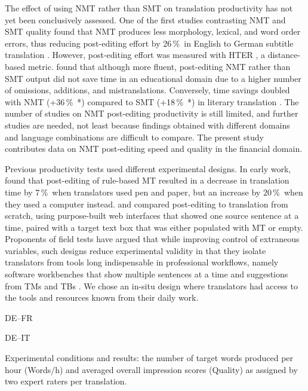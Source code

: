 \documentclass[11pt]{article}
\newcommand{\percent}{\,\%\ }
\begin{document}
The effect of using NMT rather than SMT on translation productivity has not yet been conclusively assessed. One of the first studies contrasting NMT and SMT quality found that NMT produces less morphology, lexical, and word order errors, thus reducing post-editing effort by 26\percent in English to German subtitle translation \citep{Bentivogli2016}. However, post-editing effort was measured with HTER \citep{Snover2006}, a distance-based metric. \citet{Castilho2017} found that although more fluent, post-editing NMT rather than SMT output did not save time in an educational domain due to a higher number of omissions, additions, and mistranslations. Conversely, time savings doubled with NMT (+36\percent*) compared to SMT (+18\percent*) in literary translation \citep{Toral2018Literary}. The number of studies on NMT post-editing productivity is still limited, and further studies are needed, not least because findings obtained with different domains and language combinations are difficult to compare. The present study contributes data on NMT post-editing speed and quality in the financial domain.

Previous productivity tests used different experimental designs. In early work, \citet{Krings1994} found that post-editing of rule-based MT resulted in a decrease in translation time by 7\percent when translators used pen and paper, but an increase by 20\percent when they used a computer instead. \citet{PlittMasselot2010} and \citet{Green2013} compared post-editing to translation from scratch, using purpose-built web interfaces that showed one source sentence at a time, paired with a target text box that was either populated with MT or empty. Proponents of field tests have argued that while improving control of extraneous variables, such designs reduce experimental validity in that they isolate translators from tools long indispensable in professional workflows, namely software workbenches that show multiple sentences at a time and suggestions from TMs and TBs \citep{Federico2012,Laeubli2013}. We chose an in-situ design where translators had access to the tools and resources known from their daily work.

\begin{table*}[t]
    \centering
    \begin{subtable}[b]{0.48\textwidth}
        \centering
        \renewcommand{\arraystretch}{1.2}
    \fontsize{10.1pt}{10.1pt}\selectfont
        
        \caption{DE--FR}
        \label{tab:ResultsFR}
    \end{subtable}
    \quad
    \begin{subtable}[b]{0.48\textwidth}
        \centering
        \renewcommand{\arraystretch}{1.2}
        \fontsize{10.1pt}{10.1pt}\selectfont
        
        \caption{DE--IT}
        \label{tab:ResultsIT}
    \end{subtable}
    \caption{Experimental conditions and results: the number of target words produced per hour (Words/h) and averaged overall impression scores (Quality) as assigned by two expert raters per translation.}
    \label{tab:Results}
\end{table*}
\end{document}
